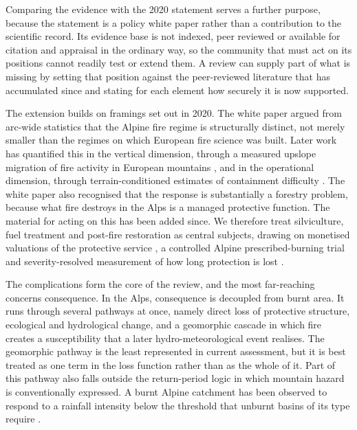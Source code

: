 \documentclass[11pt,a4paper]{article}
\begin{document}
Comparing the evidence with the 2020 statement serves a further purpose, because the statement is a policy white paper rather than a contribution to the scientific record. Its evidence base is not indexed, peer reviewed or available for citation and appraisal in the ordinary way, so the community that must act on its positions cannot readily test or extend them. A review can supply part of what is missing by setting that position against the peer-reviewed literature that has accumulated since and stating for each element how securely it is now supported.

The extension builds on framings set out in 2020. The white paper argued from arc-wide statistics that the Alpine fire regime is structurally distinct, not merely smaller than the regimes on which European fire science was built. Later work has quantified this in the vertical dimension, through a measured upslope migration of fire activity in European mountains \citep{beloiu_climatedriven_2026}, and in the operational dimension, through terrain-conditioned estimates of containment difficulty \citep{cardil_assessing_2025}. The white paper also recognised that the response is substantially a forestry problem, because what fire destroys in the Alps is a managed protective function. The material for acting on this has been added since. We therefore treat silviculture, fuel treatment and post-fire restoration as central subjects, drawing on monetised valuations of the protective service \citep{accastello_asforesee_2019, moos_climate_2021}, a controlled Alpine prescribed-burning trial \citep{gamba_prescribed_2025} and severity-resolved measurement of how long protection is lost \citep{melzner_wildfire-induced_2025}.

The complications form the core of the review, and the most far-reaching concerns consequence. In the Alps, consequence is decoupled from burnt area. It runs through several pathways at once, namely direct loss of protective structure, ecological and hydrological change, and a geomorphic cascade in which fire creates a susceptibility that a later hydro-meteorological event realises. The geomorphic pathway is the least represented in current assessment, but it is best treated as one term in the loss function rather than as the whole of it. Part of this pathway also falls outside the return-period logic in which mountain hazard is conventionally expressed. A burnt Alpine catchment has been observed to respond to a rainfall intensity below the threshold that unburnt basins of its type require \citep{laporta_postwildfire_2025}.
\end{document}

